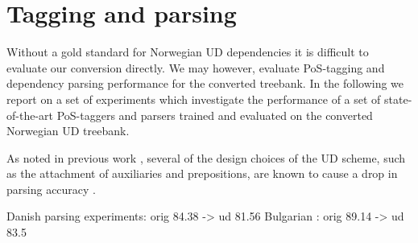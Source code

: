 \documentclass[10pt, a4paper]{article}
\begin{document}



\section{Tagging and parsing}
Without a gold standard for Norwegian UD dependencies it is difficult
to evaluate our conversion directly. We may however, evaluate
PoS-tagging and dependency parsing performance for the converted
treebank.  In the following we report on a set of experiments which
investigate the performance of a set of state-of-the-art PoS-taggers
and parsers trained and evaluated on the converted Norwegian UD
treebank.

As noted in previous work \cite{Mar:Doz:Sil:14}, several of the design
choices of the UD scheme, such as the attachment of auxiliaries and
prepositions, are known to cause a drop in parsing accuracy
\cite{Sch:Abe:Rap:12}. 

Danish parsing experiments: \cite{Joh:Alo:Pla:15} orig 84.38 -> ud 81.56
Bulgarian \cite{Ose:Sim:15}: orig 89.14 -> ud 83.5
\end{document}
